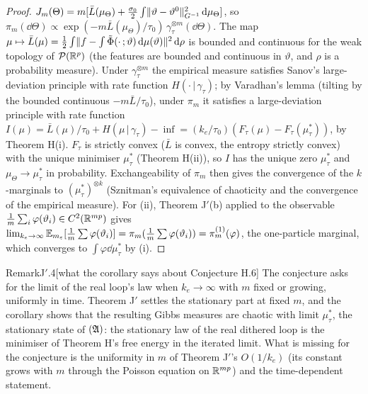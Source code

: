 \begin{proof}
$J_m(\Theta) = m[\bar L(\mu_\Theta) + \frac{\sigma_0}2\int\lVert \vartheta - \vartheta^0\rVert^2_{G^{-1}}\,\mathrm{d}\mu_\Theta]$, so
$\pi_m(\dd\Theta)\propto\exp(-m\bar L(\mu_\Theta)/\tau_0)\,\gamma_\tau^{\otimes m}(\dd\Theta)$. The map
$\mu\mapsto\bar L(\mu) = \frac12\int\lVert f - \int\tilde\Phi(\cdot\,;\vartheta)\,\mathrm{d}\mu(\vartheta)\rVert^2\,\mathrm{d}\rho$ is
bounded and continuous for the weak topology of $\mathcal{P}(\mathbb{R}^p)$ (the features are bounded and continuous in
$\vartheta$, and $\rho$ is a probability measure). Under $\gamma_\tau^{\otimes m}$ the empirical measure satisfies
Sanov's large-deviation principle with rate function $H(\cdot\,|\,\gamma_\tau)$; by Varadhan's lemma (tilting by the
bounded continuous $-m\bar L/\tau_0$), under $\pi_m$ it satisfies a large-deviation principle with rate function
$I(\mu) = \bar L(\mu)/\tau_0 + H(\mu\,|\,\gamma_\tau) - \inf = (k_e/\tau_0)(F_\tau(\mu) - F_\tau(\mu^*_\tau))$, by
Theorem H(i). $F_\tau$ is strictly convex ($\bar L$ is convex, the entropy strictly convex) with the unique minimiser
$\mu^*_\tau$ (Theorem H(ii)), so $I$ has the unique zero $\mu^*_\tau$ and $\mu_\Theta\to\mu^*_\tau$ in probability.
Exchangeability of $\pi_m$ then gives the convergence of the $k$-marginals to $(\mu^*_\tau)^{\otimes k}$ (Sznitman's
equivalence of chaoticity and the convergence of the empirical measure). For (ii), Theorem J$'$(b) applied to the
observable $\frac1m\sum_i\varphi(\vartheta_i)\in C^2(\mathbb{R}^{mp})$ gives
$\lim_{k_e\to\infty}\mathbb{E}_{m_\varepsilon}[\frac1m\sum\varphi(\vartheta_i)] = \pi_m(\frac1m\sum\varphi(\vartheta_i)) = \pi_m^{(1)}(\varphi)$,
the one-particle marginal, which converges to $\int\varphi\dd\mu^*_\tau$ by (i).
\end{proof}

\begin{rmk}{Remark}{J$'$.4}[what the corollary says about Conjecture H.6]
The conjecture asks for the limit of the real loop's law when $k_e\to\infty$ with $m$ fixed or growing, uniformly in
time. Theorem J$'$ settles the stationary part at fixed $m$, and the corollary shows that the resulting Gibbs measures
are chaotic with limit $\mu^*_\tau$, the stationary state of $(\mathfrak{A})$: the stationary law of the real dithered loop is
the minimiser of Theorem H's free energy in the iterated limit. What is missing for the conjecture is the uniformity
in $m$ of Theorem J$'$'s $O(1/k_e)$ (its constant grows with $m$ through the Poisson equation on $\mathbb{R}^{mp}$) and the
time-dependent statement.
\end{rmk}

